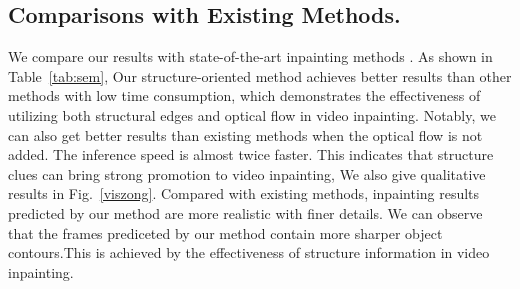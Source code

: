 %

\subsection{Comparisons with Existing Methods.}
We compare our results with state-of-the-art inpainting methods \cite{nazeri2019edgeconnect,wang2019video,Kim_2019_CVPR1,Xu_2019_CVPR}. 
As shown in Table~\ref{tab:sem}, Our structure-oriented method achieves better results than other methods with low time consumption, which demonstrates the effectiveness of utilizing both structural edges and optical flow in video inpainting. Notably, we can also get better results than existing methods when the optical flow is not added. The inference speed is almost twice faster. This indicates that structure clues can bring strong promotion to video inpainting, 
We also give qualitative results in Fig.~\ref{viszong}. Compared with existing methods, inpainting results predicted by our method are more realistic with finer details. We can observe that the frames prediceted by our method contain more sharper object contours.This is achieved by the effectiveness of structure information in video inpainting.















